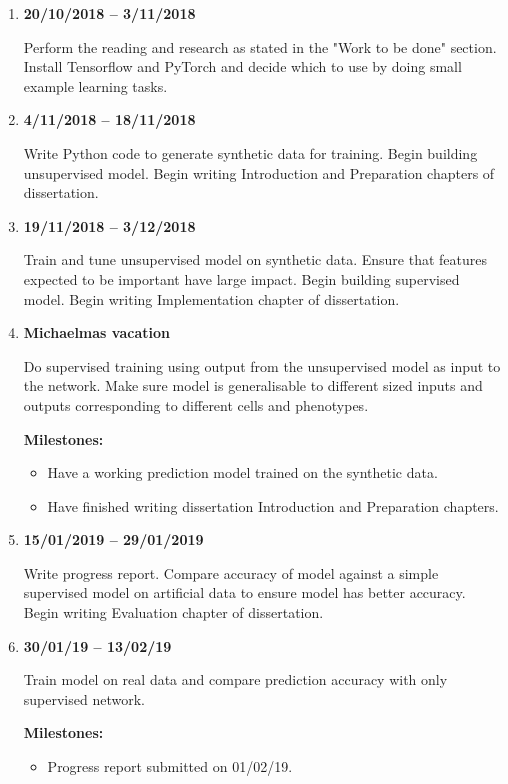 \documentclass[12pt,a4paper,twoside,openany]{article}
\begin{document}
\begin{enumerate}

\item \textbf{20/10/2018 -- 3/11/2018 } 

Perform the reading and research as stated in the "Work to be done" section. Install Tensorflow and PyTorch and decide which to use by doing small example learning tasks.

\item \textbf{4/11/2018 -- 18/11/2018} 

Write Python code to generate synthetic data for training. Begin building unsupervised model. Begin writing Introduction and Preparation chapters of dissertation.

\item \textbf{19/11/2018 -- 3/12/2018} 

Train and tune unsupervised model on synthetic data. Ensure that features expected to be important have large impact. Begin building supervised model. Begin writing Implementation chapter of dissertation.

\item \textbf{Michaelmas vacation} 

Do supervised training using output from the unsupervised model as input to the network. Make sure model is generalisable to different sized inputs and outputs corresponding to different cells and phenotypes.

\textbf{Milestones:}
\begin{itemize}
    \item Have a working prediction model trained on the synthetic data.
    \item Have finished writing dissertation Introduction and Preparation chapters.
\end{itemize}

\item \textbf{15/01/2019 -- 29/01/2019} 

Write progress report. Compare accuracy of model against a simple supervised model on artificial data to ensure model has better accuracy. Begin writing Evaluation chapter of dissertation.

\item \textbf{30/01/19 -- 13/02/19} 

Train model on real data and compare prediction accuracy with only supervised network.

\textbf{Milestones:}
\begin{itemize}
    \item Progress report submitted on 01/02/19.
\end{itemize}


\end{enumerate}
\end{document}

